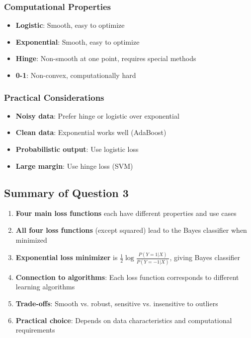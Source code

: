 \documentclass[12pt,a4paper]{article}
\begin{document}
\subsubsection{Computational Properties}
\begin{itemize}
    \item \textbf{Logistic}: Smooth, easy to optimize
    \item \textbf{Exponential}: Smooth, easy to optimize
    \item \textbf{Hinge}: Non-smooth at one point, requires special methods
    \item \textbf{0-1}: Non-convex, computationally hard
\end{itemize}

\subsubsection{Practical Considerations}
\begin{itemize}
    \item \textbf{Noisy data}: Prefer hinge or logistic over exponential
    \item \textbf{Clean data}: Exponential works well (AdaBoost)
    \item \textbf{Probabilistic output}: Use logistic loss
    \item \textbf{Large margin}: Use hinge loss (SVM)
\end{itemize}

\subsection{Summary of Question 3}

\begin{enumerate}
    \item \textbf{Four main loss functions} each have different properties and use cases
    \item \textbf{All four loss functions} (except squared) lead to the Bayes classifier when minimized
    \item \textbf{Exponential loss minimizer} is $\frac{1}{2} \log \frac{P(Y=1|X)}{P(Y=-1|X)}$, giving Bayes classifier
    \item \textbf{Connection to algorithms}: Each loss function corresponds to different learning algorithms
    \item \textbf{Trade-offs}: Smooth vs. robust, sensitive vs. insensitive to outliers
    \item \textbf{Practical choice}: Depends on data characteristics and computational requirements
\end{enumerate}
\end{document}
